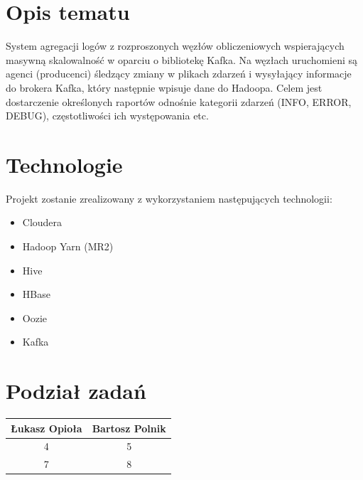 \documentclass[a4paper,11pt]{article}
\begin{document}
\section{Opis tematu}
    System agregacji logów z rozproszonych węzłów obliczeniowych wspierających masywną skalowalność w oparciu o bibliotekę Kafka. Na węzłach uruchomieni są agenci (producenci) śledzący zmiany w plikach zdarzeń i wysyłający informacje do brokera Kafka, który następnie wpisuje dane do Hadoopa. Celem jest dostarczenie określonych raportów odnośnie kategorii zdarzeń (INFO, ERROR, DEBUG), częstotliwości ich występowania etc.

\section{Technologie} 
    Projekt zostanie zrealizowany z wykorzystaniem następujących technologii:
    \begin{itemize}
        \item Cloudera
        \item Hadoop Yarn (MR2)
        \item Hive
        \item HBase
        \item Oozie
        \item Kafka
    \end{itemize}

\section{Podział zadań}

\begin{tabular}{ c | c }
  Łukasz Opioła & Bartosz Polnik \\ \hline
  4 & 5 \\
  7 & 8 \\
\end{tabular}
\end{document}

